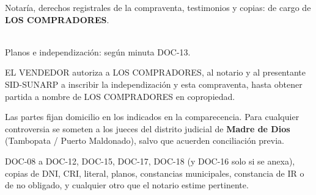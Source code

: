 \documentclass[12pt,a4paper]{article}
\begin{document}
Notaría, derechos registrales de la compraventa, testimonios y copias: de cargo de \textbf{LOS COMPRADORES}.

\vspace{0.15em}
\\[0.25em]
Planos e independización: según minuta DOC-13.

EL VENDEDOR autoriza a LOS COMPRADORES, al notario y al presentante SID-SUNARP a inscribir la independización y esta compraventa, hasta obtener partida a nombre de LOS COMPRADORES en copropiedad.

Las partes fijan domicilio en los indicados en la comparecencia. Para cualquier controversia se someten a los jueces del distrito judicial de \textbf{Madre de Dios} (Tambopata / Puerto Maldonado), salvo que acuerden conciliación previa.

DOC-08 a DOC-12, DOC-15, DOC-17, DOC-18 (y DOC-16 solo si se anexa), copias de DNI, CRI, literal, planos, constancias municipales, constancia de IR o de no obligado, y cualquier otro que el notario estime pertinente.

\CierreMinuta
\LugarFecha

\vspace{0.15em}

\vspace{0.7em}
\noindent
{}
\end{document}

